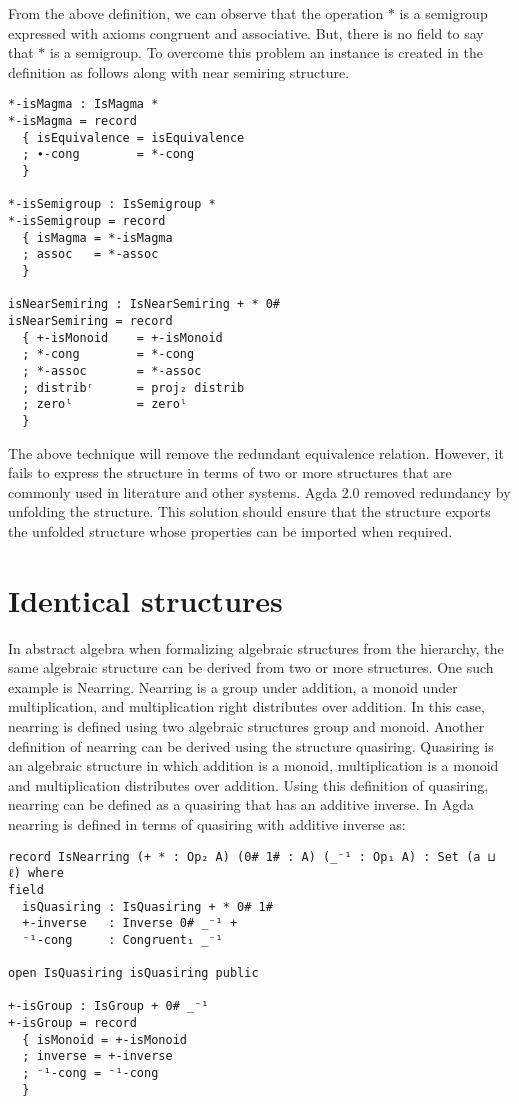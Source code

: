 From the above definition, we can observe that the operation $*$ is a semigroup
expressed with axioms congruent and associative. But, there is no field to
say that $*$ is a semigroup. To overcome this problem an instance is created in
the definition as follows along with near semiring structure.

\begin{verbatim}
*-isMagma : IsMagma *
*-isMagma = record
  { isEquivalence = isEquivalence
  ; ∙-cong        = *-cong
  }

*-isSemigroup : IsSemigroup *
*-isSemigroup = record
  { isMagma = *-isMagma
  ; assoc   = *-assoc
  }

isNearSemiring : IsNearSemiring + * 0#
isNearSemiring = record
  { +-isMonoid    = +-isMonoid
  ; *-cong        = *-cong
  ; *-assoc       = *-assoc
  ; distribʳ      = proj₂ distrib
  ; zeroˡ         = zeroˡ
  }
\end{verbatim}

The above technique will remove the redundant equivalence relation. However, it
fails to express the structure in terms of two or more structures that are
commonly used in literature and other systems. Agda 2.0 removed redundancy by
unfolding the structure. This solution should ensure that the structure exports
the unfolded structure whose properties can be imported when required.

\section{Identical structures}
In abstract algebra when formalizing algebraic structures from the hierarchy,
the same algebraic structure can be derived from two or more structures. One
such example is Nearring. Nearring is a group under addition, a monoid under
multiplication, and multiplication right distributes over addition. In this
case, nearring is defined using two algebraic structures group and monoid.
Another definition of nearring can be derived using the structure quasiring.
Quasiring is an algebraic structure in which addition is a monoid,
multiplication is a monoid and multiplication distributes over addition. Using
this definition of quasiring, nearring can be defined as a quasiring that has an
additive inverse. In Agda nearring is defined in terms of quasiring with
additive inverse as: 

\begin{verbatim}
record IsNearring (+ * : Op₂ A) (0# 1# : A) (_⁻¹ : Op₁ A) : Set (a ⊔ ℓ) where
field
  isQuasiring : IsQuasiring + * 0# 1#
  +-inverse   : Inverse 0# _⁻¹ +
  ⁻¹-cong     : Congruent₁ _⁻¹

open IsQuasiring isQuasiring public

+-isGroup : IsGroup + 0# _⁻¹
+-isGroup = record 
  { isMonoid = +-isMonoid 
  ; inverse = +-inverse 
  ; ⁻¹-cong = ⁻¹-cong 
  }
\end{verbatim}

